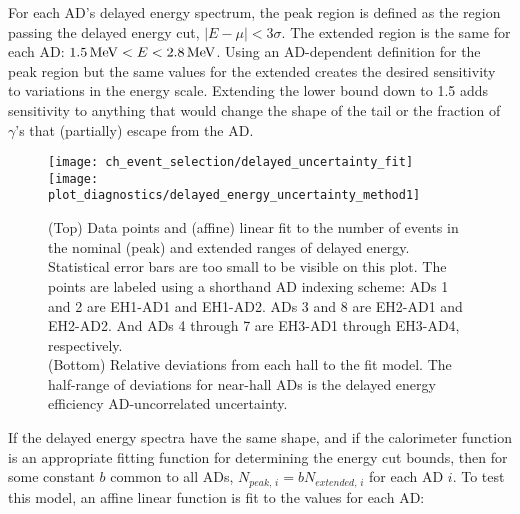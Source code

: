 For each AD's delayed energy spectrum, the peak region is defined as
the region passing the delayed energy cut, $\vert E-\mu \vert < 3\sigma$.
The extended region is the same for each AD:
$\SI{1.5}{\mega\electronvolt} < E < \SI{2.8}{\mega\electronvolt}$.
Using an AD-dependent definition for the peak region but
the same values for the extended creates
the desired sensitivity to variations in the energy scale.
Extending the lower bound down to \SI{1.5}{\mev} adds sensitivity to
anything that would change the shape of the tail
or the fraction of $\gamma$'s that (partially) escape from the AD.

\begin{figure}
    \centering
    \texttt{[image: ch\_event\_selection/delayed\_uncertainty\_fit]}\\
    \texttt{[image: plot\_diagnostics/delayed\_energy\_uncertainty\_method1]}
    \caption[Delayed energy efficiency uncertainty]{
        (Top) Data points and (affine) linear fit
        to the number of events in the nominal (peak)
        and extended ranges of delayed energy.
        Statistical error bars are too small to be visible on this plot.
        The points are labeled using a shorthand AD indexing scheme:
        ADs 1 and 2 are EH1-AD1 and EH1-AD2. ADs 3 and 8 are EH2-AD1 and EH2-AD2.
        And ADs 4 through 7 are EH3-AD1 through EH3-AD4, respectively.\\
        (Bottom) Relative deviations from each hall to the fit model.
        The half-range of deviations for near-hall ADs
        is the delayed energy efficiency AD-uncorrelated uncertainty.
    }
    \label{fig:delayed_eff_unc_fit}
\end{figure}


If the delayed energy spectra have the same shape,
and if the calorimeter function is an appropriate fitting function
for determining the energy cut bounds,
then for some constant $b$ common to all ADs,
$N_{peak,\,i} = b N_{extended,\,i}$ for each AD $i$.
To test this model, an affine linear function is fit
to the values for each AD:

